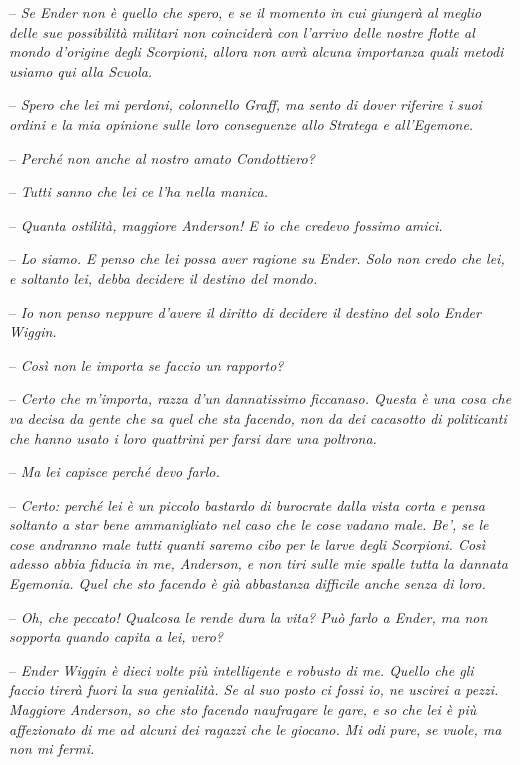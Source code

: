 {-- \emph{Se Ender non è quello che spero, e se il momento in cui
		giungerà al meglio delle sue possibilità militari non coinciderà con
		l'arrivo delle nostre flotte al mondo d'origine degli Scorpioni, allora
		non avrà alcuna importanza quali metodi usiamo qui alla Scuola.}}

{-- \emph{Spero che lei mi perdoni, colonnello Graff, ma sento di dover
		riferire i suoi ordini e la mia opinione sulle loro conseguenze allo
		Stratega e all'Egemone.}}

{-- \emph{Perché non anche al nostro amato Condottiero?}}

{-- \emph{Tutti sanno che lei ce l'ha nella manica.}}

{-- \emph{Quanta ostilità, maggiore Anderson! E io che credevo fossimo
		amici.}}

{-- \emph{Lo siamo. E penso che lei possa aver ragione su Ender. Solo
		non credo che lei, e soltanto lei, debba decidere il destino del
		mondo.}}

{-- \emph{Io non penso neppure d'avere il diritto di decidere il destino
		del solo Ender Wiggin.}}

{-- \emph{Così non le importa se faccio un rapporto?}}

{-- \emph{Certo che m'importa, razza d'un dannatissimo ficcanaso. Questa
		è una cosa che va decisa da gente che sa quel che sta facendo, non da
		dei cacasotto di politicanti che hanno usato i loro quattrini per farsi
		dare una poltrona.}}

{-- \emph{Ma lei capisce perché devo farlo.}}

{-- \emph{Certo: perché lei è un piccolo bastardo di burocrate dalla
		vista corta e pensa soltanto a star bene ammanigliato nel caso che le
		cose vadano male. Be', se le cose andranno male tutti quanti saremo cibo
		per le larve degli Scorpioni. Così adesso abbia fiducia in me, Anderson,
		e non tiri sulle mie spalle tutta la dannata Egemonia. Quel che sto
		facendo è già abbastanza difficile anche senza di loro.}}

{-- \emph{Oh, che peccato! Qualcosa le rende dura la vita? Può farlo a
		Ender, ma non sopporta quando capita a lei, vero?}}

{-- \emph{Ender Wiggin è dieci volte più intelligente e robusto di me.
		Quello che gli faccio tirerà fuori la sua genialità. Se al suo posto ci
		fossi io, ne uscirei a pezzi. Maggiore Anderson, so che sto facendo
		naufragare le gare, e so che lei è più affezionato di me ad alcuni dei
		ragazzi che le giocano. Mi odi pure, se vuole, ma non mi fermi.}}

